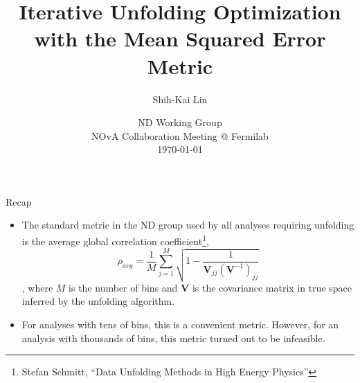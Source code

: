 \documentclass[aspectratio=169]{beamer}
\title{Iterative Unfolding Optimization with the Mean Squared Error Metric}
\date[today]{ND Working Group\\ NOvA Collaboration Meeting @ Fermilab\\ \today}
\author{Shih-Kai Lin}
\institute{Colorado State University}
\begin{document}
\begin{frame}
\titlepage
\end{frame}

\begin{frame}{Recap}
  \begin{itemize}
    \item The standard metric in the ND group used by all analyses requiring unfolding is the average global correlation coefficient\footnote[frame]{Stefan Schmitt, ``Data Unfolding Methods in High Energy Physics''},
      \begin{equation} \label{eq:1}
        \rho_{avg}=\frac{1}{M}\sum_{j=1}^{M}\sqrt{1-\frac{1}{\pmb{V}_{jj}(\pmb{V}^{-1})_{jj}}}
      \end{equation}
    , where $M$ is the number of bins and $\pmb{V}$ is the covariance matrix in true space inferred by the unfolding algorithm.
    \item For analyses with tens of bins, this is a convenient metric. However, for an analysis with thousands of bins, this metric turned out to be infeasible.
  \end{itemize}
\end{frame}
\end{document}
